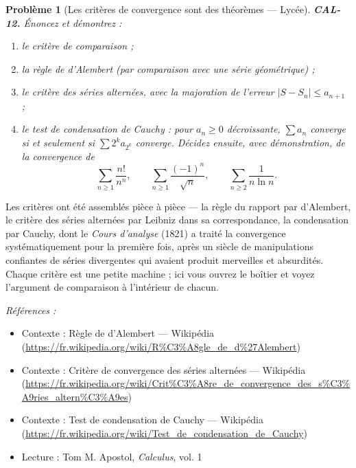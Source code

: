 \documentclass[11pt]{article}
\newtheorem{problem}{Problème}
\newenvironment{refs}{\par\small\noindent\emph{Références :}\begin{itemize}\setlength\itemsep{0pt}}{\end{itemize}\normalsize}
\begin{document}
\bigskip

\begin{problem}[{Les critères de convergence sont des théorèmes --- Lycée}]
\textbf{CAL-12.} Énoncez et démontrez :
\begin{enumerate}
\item[(i)] le critère de comparaison ;
\item[(ii)] la
règle de d'Alembert (par comparaison avec une série géométrique) ;
\item[(iii)] le critère des séries alternées,
avec la majoration de l'erreur $ |S - S_n| \le a_{n+1} $ ;
\item[(iv)] le test de condensation
de Cauchy : pour $ a_n \ge 0 $ décroissante, $ \sum a_n $ converge si et seulement si
$ \sum 2^k a_{2^k} $ converge. Décidez ensuite, avec démonstration, de la convergence de
\[ \sum_{n\ge 1} \frac{n!}{n^n}, \qquad \sum_{n\ge 1} \frac{(-1)^n}{\sqrt{n}},
\qquad \sum_{n\ge 2} \frac{1}{n \ln n}. \]
\end{enumerate}

\end{problem}

\noindent Les critères ont été assemblés pièce à pièce --- la règle du rapport par d'Alembert,
le critère des séries alternées par Leibniz dans sa correspondance, la condensation par Cauchy, dont le
\textit{Cours d'analyse} (1821) a traité la convergence systématiquement pour la première fois, après un siècle
de manipulations confiantes de séries divergentes qui avaient produit merveilles et absurdités.
Chaque critère est une petite machine ; ici vous ouvrez le boîtier et voyez l'argument de comparaison
à l'intérieur de chacun.

\begin{refs}
\item Contexte : Règle de d'Alembert --- Wikipédia (\url{https://fr.wikipedia.org/wiki/R%C3%A8gle_de_d%27Alembert})
\item Contexte : Critère de convergence des séries alternées --- Wikipédia (\url{https://fr.wikipedia.org/wiki/Crit%C3%A8re_de_convergence_des_s%C3%A9ries_altern%C3%A9es})
\item Contexte : Test de condensation de Cauchy --- Wikipédia (\url{https://fr.wikipedia.org/wiki/Test_de_condensation_de_Cauchy})
\item Lecture : Tom M. Apostol, \textit{Calculus}, vol. 1
\end{refs}

\bigskip
\end{document}
